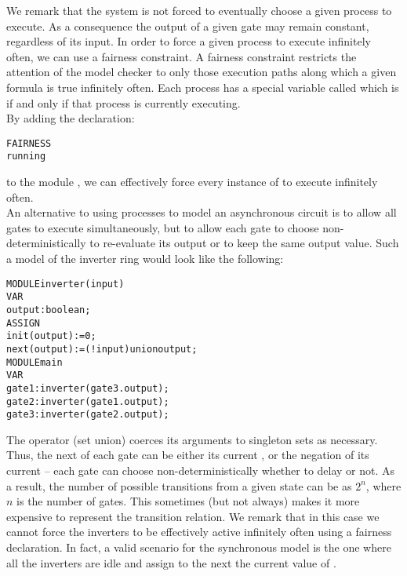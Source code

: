 We remark that the system is not forced to eventually choose a given
process to execute. As a consequence the output of a given gate may remain
constant, regardless of its input.
In order to force a given process to execute infinitely often, we can
use a fairness constraint. 
A fairness constraint restricts the attention of the model checker to
only those execution paths along which a given formula is true
infinitely often. Each process has a special variable called
 which is  if and only if that process is
currently executing.\\
By adding the declaration:\\
\begin{alltt}
FAIRNESS
  running
\end{alltt}
to the module , we can effectively force every
instance of  to execute infinitely often.\\
An alternative to using processes to model an asynchronous circuit
is to allow all gates to execute simultaneously, but to allow each gate
to choose non-deterministically to re-evaluate its output or to keep the
same output value. Such a model of the inverter ring would look like the
following:\\
\begin{alltt}
MODULE inverter(input)
 VAR
   output : boolean;
 ASSIGN
  init(output) := 0;
  next(output) := (!input) union output;
MODULE main
 VAR
   gate1 : inverter(gate3.output);
   gate2 : inverter(gate1.output);
   gate3 : inverter(gate2.output);
\end{alltt}
The  operator (set union) coerces its arguments to
singleton sets as necessary. Thus, the next  of each gate
can be either its current , or the negation of its
current  -- each gate can choose non-deterministically
whether to delay or not. As a result, the number of possible
transitions from a given state can be as $2^n$,
where $n$ is the number of gates. This sometimes (but not always)
makes it more expensive to represent the transition relation.
We remark that in this case we cannot force the inverters to be
effectively active infinitely often using a fairness declaration. In
fact, a valid scenario for the synchronous model is the one where all
the inverters are idle and assign to the next  the current
value of .

